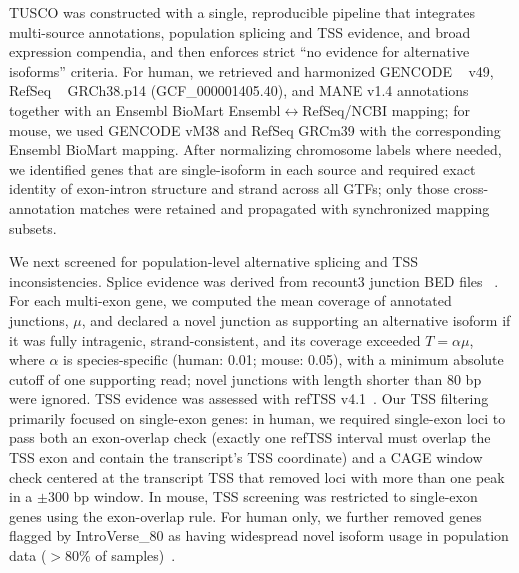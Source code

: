 \documentclass[pdflatex,sn-nature]{sn-jnl}%
\begin{document}
TUSCO was constructed with a single, reproducible pipeline that integrates multi-source annotations, population splicing and TSS evidence, and broad expression compendia, and then enforces strict ``no evidence for alternative isoforms'' criteria. For human, we retrieved and harmonized GENCODE ~\cite{Harrow2012GENCODE} v49, RefSeq ~\cite{OLeary2016RefSeq} GRCh38.p14 (GCF\_000001405.40), and MANE\cite{Morales2022Joint} v1.4 annotations together with an Ensembl BioMart Ensembl$\leftrightarrow$RefSeq/NCBI mapping\cite{Kinsella2011Ensembl}; for mouse, we used GENCODE vM38 and RefSeq GRCm39 with the corresponding Ensembl BioMart mapping. After normalizing chromosome labels where needed, we identified genes that are single-isoform in each source and required exact identity of exon-intron structure and strand across all GTFs; only those cross-annotation matches were retained and propagated with synchronized mapping subsets.

We next screened for population-level alternative splicing and TSS inconsistencies. Splice evidence was derived from recount3 junction BED files ~\cite{Wilks2021recount3}. For each multi-exon gene, we computed the mean coverage of annotated junctions, $\mu$, and declared a novel junction as supporting an alternative isoform if it was fully intragenic, strand-consistent, and its coverage exceeded $T = \alpha\mu$, where $\alpha$ is species-specific (human: 0.01; mouse: 0.05), with a minimum absolute cutoff of one supporting read; novel junctions with length shorter than 80 bp were ignored. TSS evidence was assessed with refTSS v4.1~\cite{Abugessaisa2019refTSS}. Our TSS filtering primarily focused on single-exon genes: in human, we required single-exon loci to pass both an exon-overlap check (exactly one refTSS interval must overlap the TSS exon and contain the transcript's TSS coordinate) and a CAGE window check centered at the transcript TSS that removed loci with more than one peak in a $\pm 300$ bp window. In mouse, TSS screening was restricted to single-exon genes using the exon-overlap rule. For human only, we further removed genes flagged by IntroVerse\_80 as having widespread novel isoform usage in population data ($>$80\% of samples)~\cite{GarciaRuiz2023IntroVerse}.
\end{document}
